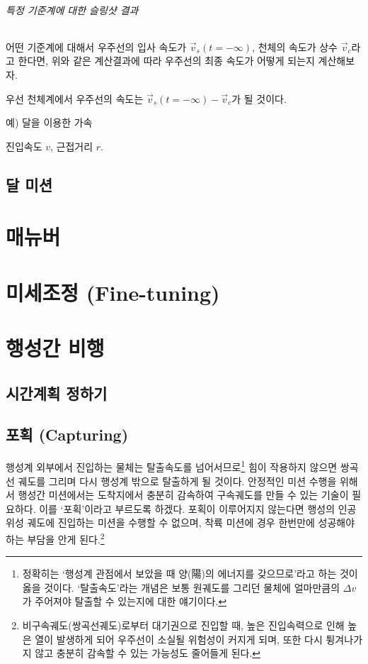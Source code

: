 \documentclass[9pt]{amsbook}
\begin{document}
\paragraph{특정 기준계에 대한 슬링샷 결과}
어떤 기준계에 대해서 우주선의 입사 속도가 $\vec{v}_s(t=-\infty)$, 천체의 속도가 상수 $\vec{v}_c$라고 한다면, 위와 같은 계산결과에 따라 우주선의 최종 속도가 어떻게 되는지 계산해보자.

우선 천체계에서 우주선의 속도는 $\vec{v}_s(t=-\infty)-\vec{v}_c$가 될 것이다.

예) 달을 이용한 가속

진입속도 $v$, 근접거리 $r$.

\chapter{달 미션}

\part{매뉴버}
\part{미세조정 (Fine-tuning)}
\part{행성간 비행}
\chapter{시간계획 정하기}
\chapter{포획 (Capturing)}
행성계 외부에서 진입하는 물체는 탈출속도를 넘어서므로\footnote{정확히는 `행성계 관점에서 보았을 때 양(陽)의 에너지를 갖으므로'라고 하는 것이 옳을 것이다. `탈출속도'라는 개념은 보통 원궤도를 그리던 물체에 얼마만큼의 $\Delta v$가 주어져야 탈출할 수 있는지에 대한 얘기이다.} 힘이 작용하지 않으면 쌍곡선 궤도를 그리며 다시 행성계 밖으로 탈출하게 될 것이다.
안정적인 미션 수행을 위해서 행성간 미션에서는 도착지에서 충분히 감속하여 구속궤도를 만들 수 있는 기술이 필요하다. 이를 `포획'이라고 부르도록 하겠다. 포획이 이루어지지 않는다면 행성의 인공위성 궤도에 진입하는 미션을 수행할 수 없으며, 착륙 미션에 경우 한번만에 성공해야 하는 부담을 안게 된다.\footnote{비구속궤도(쌍곡선궤도)로부터 대기권으로 진입할 때, 높은 진입속력으로 인해 높은 열이 발생하게 되어 우주선이 소실될 위험성이 커지게 되며, 또한 다시 튕겨나가지 않고 충분히 감속할 수 있는 가능성도 줄어들게 된다.}
\end{document}
